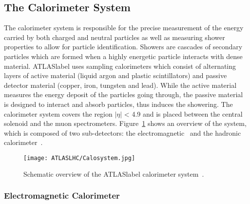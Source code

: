 \subsection{The Calorimeter System}

The calorimeter system is responsible for the precise measurement of the energy carried by both charged and neutral particles as well as measuring shower properties to allow for particle identification. Showers are cascades of secondary particles which are formed when a highly energetic particle interacts with dense material. \acrshort{ATLASlabel} uses sampling calorimeters which consist of alternating layers of active material (liquid argon and plastic scintillators) and passive detector material (copper, iron, tungsten and lead). While the active material measures the energy deposit of the particles going through, the passive material is designed to interact and absorb particles, thus induces the showering. The calorimeter system covers the region $|\eta|$ < 4.9 and is placed between the central solenoid and the muon spectrometers. Figure~\ref{figLHC:ATLASCalo} shows an overview of the system, which is composed of two sub-detectors: the electromagnetic~\cite{CERN-LHCC-96-041,CERN-LHCC-2017-018} and the hadronic calorimeter~\cite{CERN-LHCC-96-042}. 

\begin{figure}[htbp]
    \RawFloats
    \begin{center}
    \texttt{[image: ATLASLHC/Calosystem.jpg]}
    \caption{
        Schematic overview of the \acrshort{ATLASlabel} calorimeter system~\cite{Collaboration_2008}. 
    }
    \label{figLHC:ATLASCalo}
    \end{center}
\end{figure}

\subsubsection*{Electromagnetic Calorimeter}

